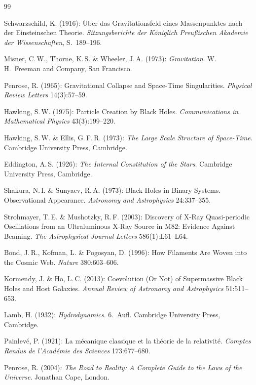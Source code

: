 ﻿\documentclass[12pt,a4paper]{report}
\begin{document}
\begin{thebibliography}{99}

Schwarzschild, K. (1916): Über das Gravitationsfeld eines Massenpunktes nach der Einsteinschen Theorie. \textit{Sitzungsberichte der Königlich Preußischen Akademie der Wissenschaften}, S.\ 189--196.

Misner, C.\,W., Thorne, K.\,S. \& Wheeler, J.\,A. (1973): \textit{Gravitation}. W.\,H.\ Freeman and Company, San Francisco.

Penrose, R. (1965): Gravitational Collapse and Space-Time Singularities. \textit{Physical Review Letters} 14(3):57--59.

Hawking, S.\,W. (1975): Particle Creation by Black Holes. \textit{Communications in Mathematical Physics} 43(3):199--220.

Hawking, S.\,W. \& Ellis, G.\,F.\,R. (1973): \textit{The Large Scale Structure of Space-Time}. Cambridge University Press, Cambridge.

Eddington, A.\,S. (1926): \textit{The Internal Constitution of the Stars}. Cambridge University Press, Cambridge.

Shakura, N.\,I. \& Sunyaev, R.\,A. (1973): Black Holes in Binary Systems. Observational Appearance. \textit{Astronomy and Astrophysics} 24:337--355.

Strohmayer, T.\,E. \& Mushotzky, R.\,F. (2003): Discovery of X-Ray Quasi-periodic Oscillations from an Ultraluminous X-Ray Source in M82: Evidence Against Beaming. \textit{The Astrophysical Journal Letters} 586(1):L61--L64.

Bond, J.\,R., Kofman, L. \& Pogosyan, D. (1996): How Filaments Are Woven into the Cosmic Web. \textit{Nature} 380:603--606.

Kormendy, J. \& Ho, L.\,C. (2013): Coevolution (Or Not) of Supermassive Black Holes and Host Galaxies. \textit{Annual Review of Astronomy and Astrophysics} 51:511--653.

Lamb, H. (1932): \textit{Hydrodynamics}. 6.\ Aufl. Cambridge University Press, Cambridge.

Painlevé, P. (1921): La mécanique classique et la théorie de la relativité. \textit{Comptes Rendus de l'Académie des Sciences} 173:677--680.

Penrose, R. (2004): \textit{The Road to Reality: A Complete Guide to the Laws of the Universe}. Jonathan Cape, London.


\end{thebibliography}
\end{document}
